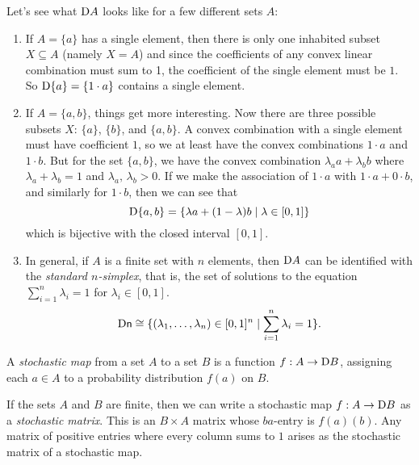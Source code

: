 \documentclass[DynamicalBook]{subfiles}
\begin{document}
\begin{example}
  Let's see what $\mathrm{D} A$ looks like for a few different sets $A$:
  \begin{enumerate}
    \item If $A = \{a\}$ has a single element, then there is only one inhabited
      subset $X \subseteq A$ (namely $X = A$) and since the coefficients of any
      convex linear combination must sum to 1, the coefficient of the single
      element must be $1$. So $\mathrm{D} \{a\} = \{1 \cdot a\}$ contains a single element.
    \item If $A = \{a, b\}$, things get more interesting. Now there are three
      possible subsets $X$: $\{a\}$, $\{b\}$, and $\{a, b\}$. A convex
      combination with a single element must have coefficient $1$, so we at
      least have the convex combinations $1 \cdot a$ and $1 \cdot b$. But for
      the set $\{a, b\}$, we have the convex combination
      $\lambda_a a + \lambda_b b$ where $\lambda_a + \lambda_b = 1$ and
      $\lambda_a,\, \lambda_b > 0$. If we make the association of $1 \cdot a$
      with $1\cdot a + 0 \cdot b$, and similarly for $1 \cdot b$, then we can
      see that
      \[
\mathrm{D} \{a, b\} = \{\lambda a + (1 - \lambda) b \mid \lambda \in [0, 1]\}
      \]
      which is bijective with the closed interval $[0, 1]$.
    \item In general, if $A$ is a finite set with $n$ elements, then $\mathrm{D}
      A$ can be identified with the \emph{standard $n$-simplex}, that is, the
      set of solutions to the equation
      $\sum_{i = 1}^n \lambda_i = 1$
      for $\lambda_i \in [0,1]$.
      \[
\mathrm{D} \mathsf{n} \cong \{(\lambda_1, \ldots, \lambda_n) \in [0,1]^n \mid \sum_{i
= 1}^n \lambda_i = 1\}.
      \]
  \end{enumerate}
\end{example}

\begin{definition}\label{def.stochastic_map}
 A \emph{stochastic map} from a set $A$ to a set $B$ is a function $f : A
 \to \mathrm{D} B$, assigning each $a \in A$ to a probability distribution $f(a)$
 on $B$.

 If the sets $A$ and $B$ are finite, then we can write a stochastic map $f
 : A \to \mathrm{D} B$ as a \emph{stochastic matrix}. This is an $B \times A$
 matrix whose $ba$-entry is $f(a)(b)$. Any matrix of positive entries where
 every column sums to $1$ arises as the stochastic matrix of a stochastic map.
\end{definition}
\end{document}
